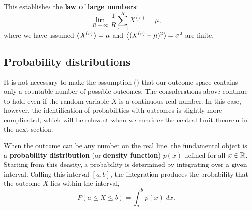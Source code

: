 \begin{shaded}
  This establishes the \textbf{law of large numbers}:
  \begin{equation}
    \lim_{R \to \infty} \frac{1}{R} \sum_{r = 1}^R X^{(r)} = \mu,
  \end{equation}
  where we have assumed $\left\langle X^{(r)} \right\rangle = \mu$ and $\left\langle (X^{(r)} - \mu)^2 \right\rangle = \sigma^2$ are finite.
\end{shaded}



\subsection{\label{sec:probdist}Probability distributions}
It is not necessary to make the assumption () that our outcome space contains only a countable number of possible outcomes.
The considerations above continue to hold even if the random variable $X$ is a continuous real number.
In this case, however, the identification of probabilities with outcomes is slightly more complicated, which will be relevant when we consider the central limit theorem in the next section.

When the outcome can be any number on the real line, the fundamental object is a \textbf{probability distribution} (or \textbf{density function}) $p(x)$ defined for all $x \in \mathbb R$.
Starting from this density, a probability is determined by integrating over a given interval.
Calling this interval $[a, b]$, the integration produces the probability that the outcome $X$ lies within the interval,
\begin{equation*}
  P\left(a \leq X \leq b\right) = \int_a^b p(x) \; dx.
\end{equation*}

